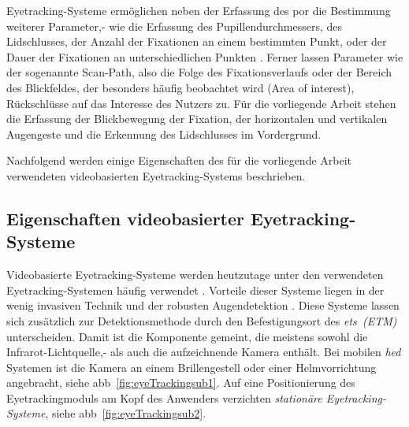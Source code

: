 Eyetracking-Systeme ermöglichen neben der Erfassung des \acs{por} die Bestimmung weiterer Parameter,- wie \zB die Erfassung des Pupillendurchmessers, des Lidschlusses, der Anzahl der Fixationen an einem bestimmten Punkt, oder der Dauer der Fixationen an unterschiedlichen Punkten \cite{Joos2003,Jacob2003, Poole2005}. Ferner lassen Parameter wie der sogenannte Scan-Path, also die Folge des Fixationsverlaufs oder der Bereich des Blickfeldes, der besonders häufig beobachtet wird (Area of interest), Rückschlüsse auf das Interesse des Nutzers \cite{Jacob2003,Lupu2013, Peters2013} zu. Für die vorliegende Arbeit stehen die Erfassung der Blickbewegung \bzw der Fixation, der horizontalen und vertikalen Augengeste und die Erkennung des Lidschlusses im Vordergrund.

Nachfolgend werden einige Eigenschaften des für die vorliegende Arbeit verwendeten videobasierten Eyetracking-Systems beschrieben.

\subsection{Eigenschaften videobasierter Eyetracking-Systeme}
\label{section:vidMet}
Videobasierte Eyetracking-Systeme werden heutzutage unter den verwendeten Eyetracking-Systemen häufig verwendet \cite{Poole2005,SMI2011}. Vorteile dieser Systeme liegen in der wenig invasiven Technik und der robusten Augen\-detektion \cite{SMI2011}. 
Diese Systeme lassen sich zusätzlich zur Detektionsmethode durch den Befestigungsort des \textit{\aclp{et}~(ETM)} unterscheiden. Damit ist die Komponente gemeint, die meistens sowohl die Infrarot-Lichtquelle,- als auch die aufzeichnende Kamera enthält. Bei mobilen \textit{\acl{hed}} Systemen ist die Kamera an einem Brillengestell oder einer Helmvorrichtung angebracht, siehe \acs{abb}~\ref{fig:eyeTrackingsub1}. Auf eine Positionierung des Eyetrackingmoduls am Kopf des Anwenders verzichten \textit{stationäre Eyetracking-Systeme}, siehe \acs{abb}~\ref{fig:eyeTrackingsub2}.

